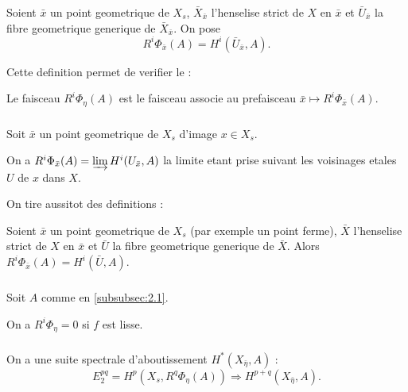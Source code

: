 \subsubsection{}
\label{subsubsec:2.2}
Soient $\bar{x}$ un point geometrique de $X_s$, $\bar{X}_{\bar{x}}$ l'henselise strict de $X$ en $\bar{x}$ et $\bar{U}_{\bar{x}}$ la fibre geometrique generique de $\bar{X}_{\bar{x}}$. On pose
\[
R^i \Phi_{\bar{x}}(A) = H^i(\bar{U}_{\bar{x}}, A) .
\]

Cette definition permet de verifier le :

\begin{proposition}
\label{prop:2.2.1}
Le faisceau $R^i \Phi_\eta(A)$ est le faisceau associe au prefaisceau $\bar{x} \mapsto R^i \Phi_{\bar{x}}(A)$.
\end{proposition}

\subsubsection{}
\label{subsubsec:2.3}
Soit $\bar{x}$ un point geometrique de $X_s$ d'image $x \in X_s$.

\begin{proposition}
\label{prop:2.3}
On a $R^i \Phi_{\bar{x}}(A) = \varinjlim H^i(U_{\bar{x}}, A)$ la limite etant prise suivant les voisinages etales $U$ de $x$ dans $X$.
\end{proposition}

On tire aussitot des definitions :

\begin{proposition}
\label{prop:2.3bis}
Soient $\bar{x}$ un point geometrique de $X_s$ (par exemple un point ferme), $\bar{X}$ l'henselise strict de $X$ en $\bar{x}$ et $\bar{U}$ la fibre geometrique generique de $\bar{X}$. Alors $R^i \Phi_{\bar{x}}(A) = H^i(\bar{U}, A)$.
\end{proposition}

\subsubsection{}
\label{subsubsec:2.4}
Soit $A$ comme en \ref{subsubsec:2.1}.

\begin{proposition}
\label{prop:2.4}
On a $R^i \Phi_\eta = 0$ si $f$ est lisse.
\end{proposition}

\subsubsection{}
\label{subsubsec:2.5}
On a une suite spectrale d'aboutissement $H^*(X_{\bar{\eta}}, A)$ :
\begin{equation}
\label{eq:ss-leray}
E_2^{pq} = H^p(X_s, R^q \Phi_\eta(A)) \Longrightarrow H^{p+q}(X_{\bar{\eta}}, A) .
\end{equation}

